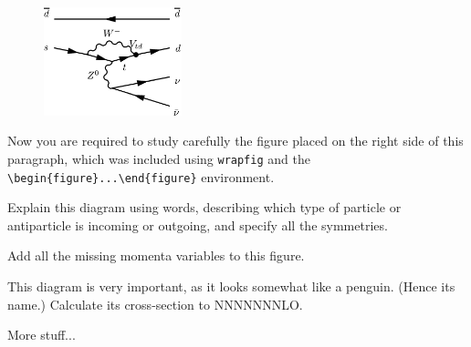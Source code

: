 \documentclass[11pt,a4paper]{article}
\begin{document}
\begin{figure}
\centering
\includegraphics[width=40mm]{fig/penguin}
\vspace*{-10mm}
\end{figure}
Now you are required to study carefully the figure placed on the right side of this
paragraph, which was included using \texttt{wrapfig} and the
\verb|\begin{figure}...\end{figure}| environment.

\begin{exenumerate} %
\item Explain this diagram using words, describing which type of particle or antiparticle
  is incoming or outgoing, and specify all the symmetries.
\item Add all the missing momenta variables to this figure.
\end{exenumerate}
\begin{exenumerate}
\item This diagram is very important, as it looks somewhat like a penguin. (Hence its
  name.) Calculate its cross-section to NNNNNNNLO.
\end{exenumerate}



More stuff...
\end{document}
